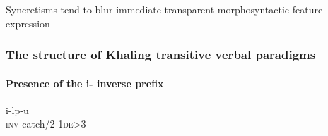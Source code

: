 \begin{frame}
\begin{smallwideitemize}
\item Syncretisms tend to blur immediate transparent morphosyntactic feature
  expression
\end{smallwideitemize}
  \end{frame} 



\begin{frame} 
\frametitle{The structure of  Khaling transitive verbal paradigms} 
\framesubtitle{Presence of the \textglotstop{}i- inverse prefix \cite{jacques12khaling}}

\begin{center}\footnotesize
{{\textglotstop}i-l{\textbaro}p-u}\\
\textsc{inv}-catch/\textsc{2}-\textsc{1de>3}\\
\end{center}


\begin{table}[H]
\end{table}
\end{frame}
